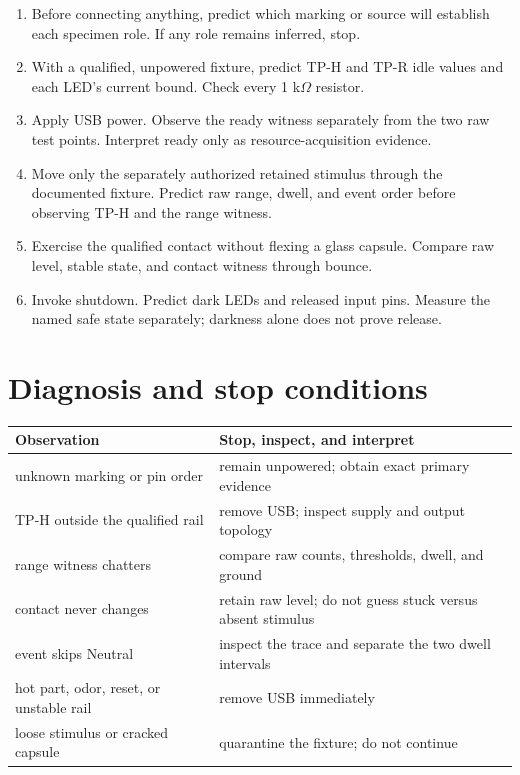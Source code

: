 \documentclass[11pt]{article}
\begin{document}
\begin{enumerate}
  \item Before connecting anything, predict which marking or source will
        establish each specimen role. If any role remains inferred, stop.
  \item With a qualified, unpowered fixture, predict TP-H and TP-R idle values
        and each LED's current bound. Check every 1 k\(\Omega\) resistor.
  \item Apply USB power. Observe the ready witness separately from the two raw
        test points. Interpret ready only as resource-acquisition evidence.
  \item Move only the separately authorized retained stimulus through the
        documented fixture. Predict raw range, dwell, and event order before
        observing TP-H and the range witness.
  \item Exercise the qualified contact without flexing a glass capsule.
        Compare raw level, stable state, and contact witness through bounce.
  \item Invoke shutdown. Predict dark LEDs and released input pins. Measure the
        named safe state separately; darkness alone does not prove release.
\end{enumerate}

\section{Diagnosis and stop conditions}

\begin{tabularx}{\linewidth}{@{}X X@{}}
\toprule
Observation & Stop, inspect, and interpret\\
\midrule
unknown marking or pin order & remain unpowered; obtain exact primary evidence\\
TP-H outside the qualified rail & remove USB; inspect supply and output topology\\
range witness chatters & compare raw counts, thresholds, dwell, and ground\\
contact never changes & retain raw level; do not guess stuck versus absent stimulus\\
event skips Neutral & inspect the trace and separate the two dwell intervals\\
hot part, odor, reset, or unstable rail & remove USB immediately\\
loose stimulus or cracked capsule & quarantine the fixture; do not continue\\
\bottomrule
\end{tabularx}
\end{document}
